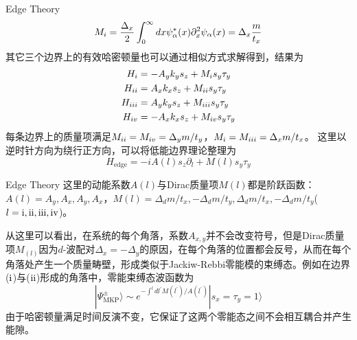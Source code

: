 \documentclass[10pt,aspectratio=169]{beamer} %
\begin{document}
\begin{frame}{Edge Theory}
\begin{equation}
M_{\uppercase\expandafter{\romannumeral1}}=\frac{\Delta_x}{2}\int_{0}^{\infty}dx\psi_\alpha^*(x)\partial_x^2\psi_\alpha(x)=\Delta_x\frac{m}{t_x}
\end{equation}
其它三个边界上的有效哈密顿量也可以通过相似方式求解得到，结果为
\begin{equation}
\begin{aligned}
H_{\uppercase\expandafter{\romannumeral1}}&=-A_yk_ys_z+M_{\uppercase\expandafter{\romannumeral1}}s_y\tau_y\\
H_{\uppercase\expandafter{\romannumeral2}}&=A_xk_xs_z+M_{\uppercase\expandafter{\romannumeral2}}s_y\tau_y\\
H_{\uppercase\expandafter{\romannumeral3}}&=A_yk_ys_z+M_{\uppercase\expandafter{\romannumeral3}}s_y\tau_y\\
H_{\uppercase\expandafter{\romannumeral4}}&=-A_xk_xs_z+M_{\uppercase\expandafter{\romannumeral4}}s_y\tau_y\\\label{edge1}
\end{aligned}
\end{equation}
每条边界上的质量项满足$M_{\uppercase\expandafter{\romannumeral2}}=M_{\uppercase\expandafter{\romannumeral4}}=\Delta_ym/t_y$，$M_{\uppercase\expandafter{\romannumeral1}}=M_{\uppercase\expandafter{\romannumeral3}}=\Delta_xm/t_x$。
这里以逆时针方向为绕行正方向，可以将低能边界理论整理为
\begin{equation}
H_{\mathrm{edge}}=-iA(l)s_z\partial_l+M(l)s_y\tau_y\label{edge2}
\end{equation}
\end{frame}
\begin{frame}{Edge Theory}
这里的动能系数$A(l)$与Dirac质量项$M(l)$都是阶跃函数：$A(l)=A_y,A_x,A_y,A_x$，$M(l)=\Delta_dm/t_x,-\Delta_dm/t_y,\Delta_dm/t_x,-\Delta_dm/t_y$($l=\mathrm{\uppercase\expandafter{\romannumeral1},\uppercase\expandafter{\romannumeral2},\uppercase\expandafter{\romannumeral3},\uppercase\expandafter{\romannumeral4}}$)。

从这里可以看出，在系统的每个角落，系数$A_{x,y}$并不会改变符号，但是Dirac质量项$M_(l)$因为$d$-波配对$\Delta_x=-\Delta_y$的原因，在每个角落的位置都会反号，从而在每个角落处产生一个质量畴壁，形成类似于Jackiw-Rebbi零能模的束缚态。例如在边界($\mathrm{\uppercase\expandafter{\romannumeral1}}$)与($\mathrm{\uppercase\expandafter{\romannumeral2}}$)形成的角落中，零能束缚态波函数为
\begin{equation}
|\Psi^\pm_{\mathrm{MKP}}\rangle\sim e^{-\int^ldl^{'}M(l^{'})/A(l^{'})}|s_x=\tau_y=1\rangle
\end{equation}
由于哈密顿量满足时间反演不变，它保证了这两个零能态之间不会相互耦合并产生能隙。
\end{frame}
\end{document}
